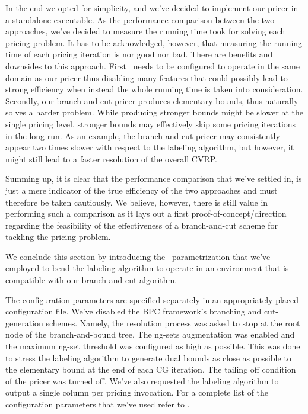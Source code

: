 \medskip

In the end we opted for simplicity, and we've decided to implement our pricer in a standalone executable.
As the performance comparison between the two approaches, we've decided to measure
the running time took for solving each pricing problem.
It has to be acknowledged, however, that measuring the running time of each pricing iteration
is nor good nor bad.
There are benefits and downsides to this approach.
First \bapcod\ needs to be configured to operate in the same domain as our pricer
thus disabling many features that could possibly lead to strong efficiency
when instead the whole running time is taken into consideration.
Secondly, our branch-and-cut pricer produces elementary bounds, thus naturally solves a harder problem.
While producing stronger bounds might be slower at the single pricing level, stronger bounds
may effectively skip some pricing iterations in the long run.
As an example, the branch-and-cut pricer may consistently appear two times slower with
respect to the labeling algorithm, but however, it might still
lead to a faster resolution of the overall CVRP.

Summing up, it is clear that the performance comparison that we've settled in, is just
a mere indicator of the true efficiency of the two approaches and must
therefore be taken cautiously.
We believe, however, there is still value in performing such a comparison as it lays
out a first proof-of-concept/direction regarding the feasibility of the effectiveness
of a branch-and-cut scheme for tackling the pricing problem.

\medskip

We conclude this section by introducing the \bapcod\ parametrization
that we've employed to bend the labeling algorithm to operate in
an environment that is compatible with our branch-and-cut algorithm.

The configuration parameters are specified separately
in an appropriately placed configuration file.
We've disabled the BPC framework's branching and cut-generation schemes.
Namely, the resolution process was asked to stop at
the root node of the branch-and-bound tree.
The ng-sets augmentation was enabled and the maximum ng-set threshold was configured
as high as possible. This was done to stress the labeling algorithm to generate dual bounds as close
as possible to the elementary bound at the end of each CG iteration.
The tailing off condition of the pricer was turned off.
We've also requested the labeling algorithm to output a single column per pricing invocation.
For a complete list of the configuration parameters
that  we've used refer to .

